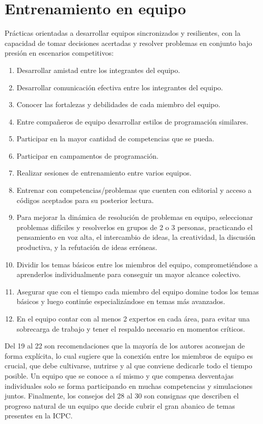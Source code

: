 \section{Entrenamiento en equipo}
Prácticas orientadas a desarrollar equipos sincronizados y resilientes, con la capacidad de tomar decisiones acertadas y resolver problemas en conjunto bajo presión en escenarios competitivos:
\begin{enumerate}[resume=icpc]
    \item Desarrollar amistad entre los integrantes del equipo.
    \item Desarrollar comunicación efectiva entre los integrantes del equipo.
    \item Conocer las fortalezas y debilidades de cada miembro del equipo.
    \item Entre compañeros de equipo desarrollar estilos de programación similares.
    \item Participar en la mayor cantidad de competencias que se pueda.
    \item Participar en campamentos de programación.
    \item Realizar sesiones de entrenamiento entre varios equipos.
    \item Entrenar con competencias/problemas que cuenten con editorial y acceso a códigos aceptados para su posterior lectura.
    \item Para mejorar la dinámica de resolución de problemas en equipo, seleccionar problemas difíciles y resolverlos en grupos de 2 o 3 personas, practicando el pensamiento en voz alta, el intercambio de ideas, la creatividad, la discusión productiva, y la refutación de ideas erróneas.
    \item Dividir los temas básicos entre los miembros del equipo, comprometiéndose a aprenderlos individualmente para conseguir un mayor alcance colectivo.
    \item Asegurar que con el tiempo cada miembro del equipo domine todos los temas básicos y luego continúe especializándose en temas más avanzados.
    \item En el equipo contar con al menos 2 expertos en cada área, para evitar una sobrecarga de trabajo y tener el respaldo necesario en momentos críticos.
\end{enumerate}
 Del 19 al 22 son recomendaciones que la mayoría de los autores aconsejan de forma explícita, lo cual sugiere que la conexión entre los miembros de equipo es crucial, que debe cultivarse, nutrirse y al que conviene dedicarle todo el tiempo posible. Un equipo que se conoce a sí mismo y que compensa desventajas individuales solo se forma participando en muchas competencias y simulaciones juntos. Finalmente, los consejos del 28 al 30 son consignas que describen el progreso natural de un equipo que decide cubrir el gran abanico de temas presentes en la ICPC.
\pagebreak
